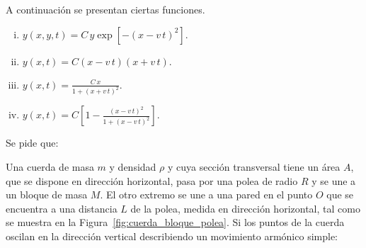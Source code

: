 \documentclass[addpoints]{exam}
\begin{document}
\begin{questions}

    \question A continuación se presentan ciertas funciones.
    \begin{enumerate}[i)]
        \item $y\left(x,y,t\right) = C \, y \exp \left[- \left(x-v \, t\right)^2\right].$
        \item $y \left(x,t\right) = C \left(x-v\,t\right) \left(x+v\,t\right).$
        \item $y\left(x,t\right) = \frac{C \, x}{1 + \left(x + v \, t\right)^2}.$
        \item $y\left(x,t\right) = C \left[1 - \frac{\left(x - v \, t\right)^2}{1 + \left(x - v \, t\right)^2}\right].$
    \end{enumerate}
    
    Se pide que:

    \question Una cuerda de masa $m$ y densidad $\rho$ y cuya sección transversal tiene un área $A$, que se dispone en dirección horizontal, pasa por una polea de radio $R$ y se une a un bloque de masa $M$. El otro extremo se une a una pared en el punto $O$ que se encuentra a una distancia $L$ de la polea, medida en dirección horizontal, tal como se muestra en la Figura~\ref{fig:cuerda_bloque_polea}. Si los puntos de la cuerda oscilan en la dirección vertical describiendo un movimiento armónico simple: \label{ej:cuerda_bloque_polea}
\end{questions}
\end{document}
